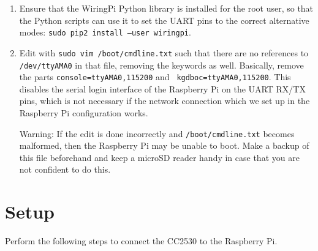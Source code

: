 \documentclass{article}
\begin{document}
\begin{enumerate}
  \item Ensure that the WiringPi Python library is installed for the root user, 
        so that the Python scripts can use it to set the UART pins to the 
        correct alternative modes: {\tt sudo pip2 install --user wiringpi}.
  \item Edit with {\tt sudo vim /boot/cmdline.txt} such that there are no 
        references to {\tt /dev/ttyAMA0} in that file, removing the keywords as 
        well. Basically, remove the parts {\tt console=ttyAMA0,115200} and {\tt 
        kgdboc=ttyAMA0,115200}. This disables the serial login interface of the 
        Raspberry Pi on the UART RX/TX pins, which is not necessary if the 
        network connection which we set up in the Raspberry Pi configuration 
        works.

        Warning: If the edit is done incorrectly and {\tt /boot/cmdline.txt} 
        becomes malformed, then the Raspberry Pi may be unable to boot. Make 
        a backup of this file beforehand and keep a microSD reader handy in 
        case that you are not confident to do this.
\end{enumerate}

\section{Setup}\label{sec:setup}

Perform the following steps to connect the CC2530 to the Raspberry Pi.
\end{document}
